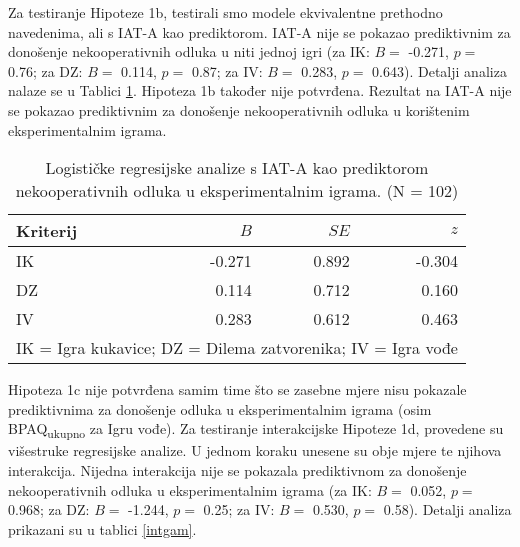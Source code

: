 \documentclass[a4paper, 12pt]{report}
\begin{document}
Za testiranje Hipoteze 1b, testirali smo modele ekvivalentne prethodno
navedenima, ali s IAT-A kao prediktorom. IAT-A nije se pokazao prediktivnim za
donošenje nekooperativnih odluka u niti jednoj igri (za IK: $B =$ -0.271, $p =$
0.76; za DZ: $B =$ 0.114, $p =$ 0.87; za IV: $B =$ 0.283, $p =$ 0.643). Detalji analiza nalaze se u
Tablici \ref{bivargamimp}. Hipoteza 1b također nije potvrđena. Rezultat na IAT-A
nije se pokazao prediktivnim za donošenje nekooperativnih odluka u korištenim
eksperimentalnim igrama.

\begin{table}[b]
    \begin{center}
        \caption{\label{bivargamimp} Logističke regresijske analize s
            IAT-A kao prediktorom nekooperativnih odluka u
            eksperimentalnim igrama. (N = 102)}
        \hspace*{-0.7cm}\begin{tabular}{lrrr}
        \toprule
        Kriterij & $B$ & $SE$ & $z$ \\
        \midrule
        IK & -0.271 & 0.892 & -0.304 \\
        DZ & 0.114 & 0.712 & 0.160 \\
        IV & 0.283 & 0.612 & 0.463 \\
        \bottomrule
        \multicolumn{4}{l}{
            \parbox{5cm}{\scriptsize \vspace{3pt} 
                IK = Igra kukavice; DZ = Dilema zatvorenika; IV = Igra vođe
        }}
    \end{tabular}
\end{center}
\end{table}

Hipoteza 1c nije potvrđena samim time što se zasebne mjere nisu pokazale
prediktivnima za donošenje odluka u eksperimentalnim igrama (osim
BPAQ\textsubscript{ukupno} za Igru vođe). Za testiranje interakcijske Hipoteze
1d, provedene su  višestruke regresijske analize. U jednom koraku unesene su
obje mjere te njihova interakcija. Nijedna interakcija nije se pokazala
prediktivnom za donošenje nekooperativnih odluka u eksperimentalnim igrama (za
IK: $B =$ 0.052, $p =$ 0.968; za DZ: $B =$ -1.244, $p =$ 0.25; za IV: $B =$
0.530, $p =$ 0.58). Detalji analiza prikazani su u tablici \ref{intgam}.
\end{document}
